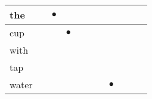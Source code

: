 \documentclass[landscape]{article}
\newcommand{\ssp}{\hspace{2pt}}
\newcommand{\mex}{\cellcolor{g}$\bullet$}
\begin{document}
\begin{tabular}{|l|p{10pt}|p{10pt}|p{10pt}|p{10pt}|p{10pt}|p{10pt}|p{10pt}|p{10pt}|p{10pt}|p{10pt}|}
\hline
\ssp \cellcolor{ref1}the \ssp&\hspace{2pt}&\hspace{2pt}\mex&\hspace{2pt}&\hspace{2pt}&\hspace{2pt}&\hspace{2pt}&\hspace{2pt}&\hspace{2pt}&\hspace{2pt}&\hspace{2pt}\\
\hline
\ssp \cellcolor{ref2}cup \ssp&\hspace{2pt}&\hspace{2pt}&\hspace{2pt}\mex&\hspace{2pt}&\hspace{2pt}&\hspace{2pt}&\hspace{2pt}&\hspace{2pt}&\hspace{2pt}&\hspace{2pt}\\
\hline
\ssp with \ssp&\hspace{2pt}&\hspace{2pt}&\hspace{2pt}&\hspace{2pt}&\hspace{2pt}&\hspace{2pt}&\hspace{2pt}&\hspace{2pt}&\hspace{2pt}&\hspace{2pt}\\
\hline
\ssp tap \ssp&\hspace{2pt}&\hspace{2pt}&\hspace{2pt}&\hspace{2pt}&\hspace{2pt}&\hspace{2pt}&\hspace{2pt}&\hspace{2pt}&\hspace{2pt}&\hspace{2pt}\\
\hline
\ssp \cellcolor{ref6}water \ssp&\hspace{2pt}&\hspace{2pt}&\hspace{2pt}&\hspace{2pt}&\hspace{2pt}&\hspace{2pt}&\hspace{2pt}\mex&\hspace{2pt}&\hspace{2pt}&\hspace{2pt}\\

\end{tabular}
\end{document}
